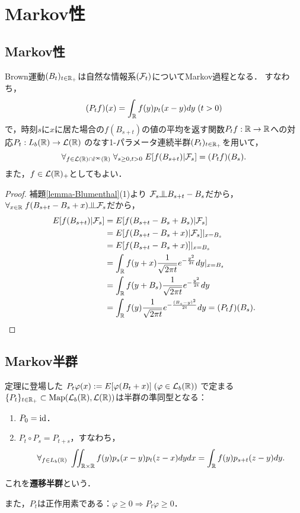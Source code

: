 \documentclass[uplatex,dvipdfmx]{jsreport}
\begin{document}
\section{Markov性}

\subsection{Markov性}

\begin{theorem}
    Brown運動$(B_t)_{t\in\mathbb{R}_+}$は自然な情報系$(\mathcal{F}_t)$についてMarkov過程となる．
    すなわち，
    \[(P_tf)(x)=\int_{\mathbb{R}} f(y)p_t(x-y)dy\;(t>0)\]
    で，時刻$s$に$x$に居た場合の$f(B_{s+t})$の値の平均を返す関数$P_tf:\mathbb{R}\to\mathbb{R}$への対応$P_t:L_b(\mathbb{R})\to\mathcal{L}(\mathbb{R})$
    のなす1-パラメータ連続半群$(P_t)_{t\in\mathbb{R}_+}$を用いて，
    \[\forall_{f\in\mathcal{L}(\mathbb{R})\cap l^\infty(\mathbb{R})}\;\forall_{s\ge0,t>0}\;E[f(B_{s+t})|\mathcal{F}_s]=(P_tf)(B_s).\]
    また，$f\in\mathcal{L}(\mathbb{R})_+$としてもよい．
\end{theorem}
\begin{proof}
    補題\ref{lemma-Blumenthal}(1)より
    $\F_s\indep B_{s+t}-B_s$だから，$\forall_{x\in\R}\;f(B_{s+t}-B_s+x)\indep\F_s$だから，
    \begin{align*}
        E[f(B_{s+t})|\mathcal{F}_s]&=E[f(B_{s+t}-B_s+B_s)|\mathcal{F}_s]\\
        &=E[f(B_{s+t}-B_s+x)|\mathcal{F}_s]|_{x=B_s}\\
        &=E[f(B_{s+t}-B_s+x)]|_{x=B_s}\\
        &=\int_{\mathbb{R}} f(y+x)\frac{1}{\sqrt{2\pi t}}e^{-\frac{y^2}{2t}}dy|_{x=B_s}\\
        &=\int_{\mathbb{R}} f(y+B_s)\frac{1}{\sqrt{2\pi t}}e^{-\frac{y^2}{2t}}dy\\
        &=\int_{\mathbb{R}} f(y)\frac{1}{\sqrt{2\pi t}}e^{-\frac{(B_s-y)^2}{2t}}dy=(P_tf)(B_s).
    \end{align*}
\end{proof}

\subsection{Markov半群}

\begin{definition}
    定理に登場した
    $P_t\varphi(x):=E[\varphi(B_t+x)]\;(\varphi\in \mathcal{L}_b(\mathbb{R}))$
    で定まる$\{P_t\}_{t\in\mathbb{R}_+}\subset\mathrm{Map}(\mathcal{L}_b(\mathbb{R}),\mathcal{L}(\mathbb{R}))$は半群の準同型となる：
    \begin{enumerate}
        \item $P_0=\mathrm{id}$．
        \item $P_t\circ P_s=P_{t+s}$，すなわち，
        \[\forall_{f\in L_b(\mathbb{R})}\;\iint_{\mathbb{R}\times\mathbb{R}} f(y)p_s(x-y)p_t(z-x)dydx=\int_{\mathbb{R}} f(y)p_{s+t}(z-y)dy.\]
    \end{enumerate}
    これを\textbf{遷移半群}という．
    
    また，$P_t$は正作用素である：$\varphi\ge0\Rightarrow P_t\varphi\ge0$．
\end{definition}
\end{document}
